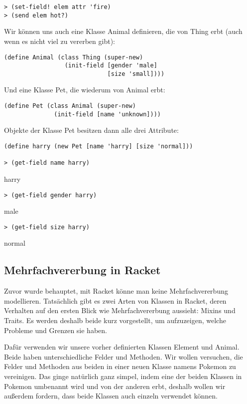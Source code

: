 \begin{lstlisting}
> (set-field! elem attr 'fire)
> (send elem hot?)
\end{lstlisting} 
{}
% 
% 

Wir können uns auch eine Klasse Animal definieren, die von Thing erbt (auch wenn es nicht viel zu vererben gibt):

\begin{lstlisting}
(define Animal (class Thing (super-new)
                 (init-field [gender 'male]
                             [size 'small])))
\end{lstlisting} 

Und eine Klasse Pet, die wiederum von Animal erbt:

\begin{lstlisting}
(define Pet (class Animal (super-new)
              (init-field [name 'unknown])))
\end{lstlisting} 

Objekte der Klasse Pet besitzen dann alle drei Attribute:

\begin{lstlisting}
(define harry (new Pet [name 'harry] [size 'normal]))

> (get-field name harry)
\end{lstlisting} 
{\rsymbol harry}

\begin{lstlisting}
> (get-field gender harry)
\end{lstlisting} 
{\rsymbol male}

\begin{lstlisting}
> (get-field size harry)
\end{lstlisting} 
{\rsymbol normal}

\subsection{Mehrfachvererbung in Racket}
Zuvor wurde behauptet, mit Racket könne man keine Mehrfachvererbung modellieren. Tatsächlich gibt es zwei Arten von Klassen in Racket, deren Verhalten auf den ersten Blick wie Mehrfachvererbung aussieht: Mixins und Traits. Es werden deshalb beide kurz vorgestellt, um aufzuzeigen, welche Probleme und Grenzen sie haben.

Dafür verwenden wir unsere vorher definierten Klassen Element und Animal. Beide haben unterschiedliche Felder und Methoden. Wir wollen versuchen, die Felder und Methoden aus beiden in einer neuen Klasse namens Pokemon zu vereinigen. %
Das ginge natürlich ganz simpel, indem eine der beiden Klassen in Pokemon umbenannt wird und von der anderen erbt, deshalb wollen wir außerdem fordern, dass beide Klassen auch einzeln verwendet können. 

